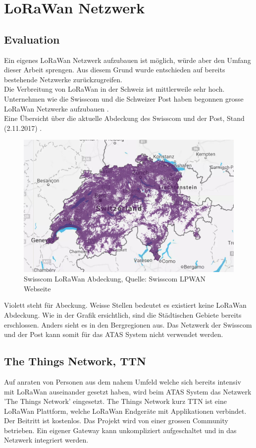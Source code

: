 \documentclass[11pt,english,german]{report}
\theoremstyle{definition}
\begin{document}
\newpage
\section{LoRaWan Netzwerk}
\subsection{Evaluation}
Ein eigenes LoRaWan Netzwerk aufzubauen ist möglich, würde aber den Umfang dieser Arbeit sprengen. Aus diesem Grund wurde entschieden auf bereits bestehende Netzwerke zurückzugreifen.\\[0.3cm]
Die Verbreitung von LoRaWan in der Schweiz ist mittlerweile sehr hoch. Unternehmen wie die Swisscom und die Schweizer Post haben begonnen grosse LoRaWan Netzwerke aufzubauen \cite{swisscompost}.\\[0.3cm]
Eine Übersicht über die aktuelle Abdeckung des Swisscom und der Post, Stand (2.11.2017)  \cite{swisscomcoverage}.
\begin{figure}[H]
	\centering
	\includegraphics[width=\textwidth]{img/lora/swisscomlorawan.jpg}
	\caption[Swisscom LoRaWan Abdeckung]
	{Swisscom LoRaWan Abdeckung, Quelle: Swisscom LPWAN Webseite \cite{swisscomcoverage}}
\end{figure}
\noindent
Violett steht für Abeckung. Weisse Stellen bedeutet es existiert keine LoRaWan Abdeckung. Wie in der Grafik ersichtlich, sind die Städtischen Gebiete bereits erschlossen. Anders sieht es in den Bergregionen aus. Das Netzwerk der Swisscom und der Post kann somit für das ATAS System nicht verwendet werden.\

\newpage
\subsection{The Things Network, TTN}
Auf anraten von Personen aus dem nahem Umfeld welche sich bereits intensiv mit LoRaWan auseinander gesetzt haben, wird beim ATAS System das Netzwerk 'The Things Network' eingesetzt. The Things Network kurz TTN ist eine LoRaWan Plattform, welche LoRaWan Endgeräte mit Applikationen verbindet. Der Beitritt ist kostenlos. Das Projekt wird von einer grossen Community betrieben. Ein eigener Gateway kann unkompliziert aufgeschaltet und in das Netzwerk integriert werden. 
\end{document}
